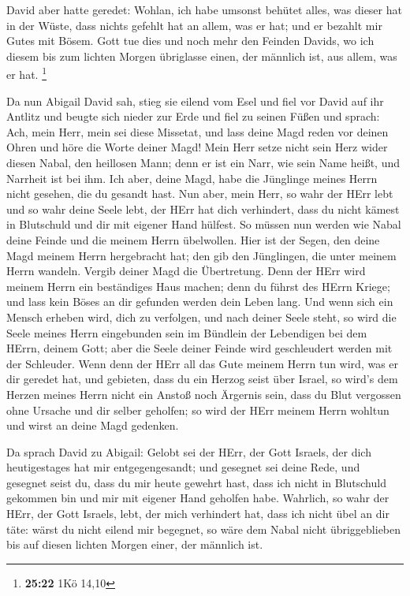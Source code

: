  David aber hatte geredet: Wohlan, ich habe umsonst
behütet alles, was dieser hat in der Wüste, dass nichts gefehlt hat an
allem, was er hat; und er bezahlt mir Gutes mit Bösem. 
Gott tue dies und noch mehr den Feinden Davids, wo ich diesem bis zum
lichten Morgen übriglasse einen, der männlich ist, aus allem, was er
hat. \footnote{\textbf{25:22} 1Kö 14,10}

 Da nun Abigail David sah, stieg sie eilend vom Esel und
fiel vor David auf ihr Antlitz und beugte sich nieder zur Erde
 und fiel zu seinen Füßen und sprach: Ach, mein Herr,
mein sei diese Missetat, und lass deine Magd reden vor deinen Ohren und
höre die Worte deiner Magd!  Mein Herr setze nicht sein
Herz wider diesen Nabal, den heillosen Mann; denn er ist ein Narr, wie
sein Name heißt, und Narrheit ist bei ihm. Ich aber, deine Magd, habe
die Jünglinge meines Herrn nicht gesehen, die du gesandt hast.
 Nun aber, mein Herr, so wahr der HErr lebt und so wahr
deine Seele lebt, der HErr hat dich verhindert, dass du nicht kämest in
Blutschuld und dir mit eigener Hand hülfest. So müssen nun werden wie
Nabal deine Feinde und die meinem Herrn übelwollen.  Hier
ist der Segen, den deine Magd meinem Herrn hergebracht hat; den gib den
Jünglingen, die unter meinem Herrn wandeln.  Vergib
deiner Magd die Übertretung. Denn der HErr wird meinem Herrn ein
beständiges Haus machen; denn du führst des HErrn Kriege; und lass kein
Böses an dir gefunden werden dein Leben lang.  Und wenn
sich ein Mensch erheben wird, dich zu verfolgen, und nach deiner Seele
steht, so wird die Seele meines Herrn eingebunden sein im Bündlein der
Lebendigen bei dem HErrn, deinem Gott; aber die Seele deiner Feinde wird
geschleudert werden mit der Schleuder.  Wenn denn der
HErr all das Gute meinem Herrn tun wird, was er dir geredet hat, und
gebieten, dass du ein Herzog seist über Israel,  so
wird's dem Herzen meines Herrn nicht ein Anstoß noch Ärgernis sein, dass
du Blut vergossen ohne Ursache und dir selber geholfen; so wird der HErr
meinem Herrn wohltun und wirst an deine Magd gedenken.

 Da sprach David zu Abigail: Gelobt sei der HErr, der
Gott Israels, der dich heutigestages hat mir entgegengesandt;
 und gesegnet sei deine Rede, und gesegnet seist du, dass
du mir heute gewehrt hast, dass ich nicht in Blutschuld gekommen bin und
mir mit eigener Hand geholfen habe.  Wahrlich, so wahr
der HErr, der Gott Israels, lebt, der mich verhindert hat, dass ich
nicht übel an dir täte: wärst du nicht eilend mir begegnet, so wäre dem
Nabal nicht übriggeblieben bis auf diesen lichten Morgen einer, der
männlich ist.

